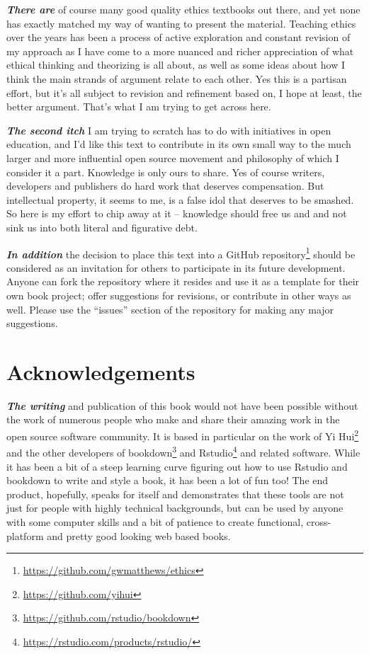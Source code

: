 \documentclass[12pt, openany]{book}
\renewcommand{\href}[2]{#2\footnote{\url{#1}}}
\begin{document}
\textbf{\emph{There are}} of course many good quality ethics textbooks out there, and yet none has exactly matched my way of wanting to present the material. Teaching ethics over the years has been a process of active exploration and constant revision of my approach as I have come to a more nuanced and richer appreciation of what ethical thinking and theorizing is all about, as well as some ideas about how I think the main strands of argument relate to each other. Yes this is a partisan effort, but it's all subject to revision and refinement based on, I hope at least, the better argument. That's what I am trying to get across here.

\textbf{\emph{The second itch}} I am trying to scratch has to do with initiatives in open education, and I'd like this text to contribute in its own small way to the much larger and more influential open source movement and philosophy of which I consider it a part. Knowledge is only ours to share. Yes of course writers, developers and publishers do hard work that deserves compensation. But intellectual property, it seems to me, is a false idol that deserves to be smashed. So here is my effort to chip away at it -- knowledge should free us and and not sink us into both literal and figurative debt.

\textbf{\emph{In addition}} the decision to place this text into a \href{https://github.com/gwmatthews/ethics}{GitHub repository} should be considered as an invitation for others to participate in its future development. Anyone can fork the repository where it resides and use it as a template for their own book project; offer suggestions for revisions, or contribute in other ways as well. Please use the ``issues'' section of the repository for making any major suggestions.

\hypertarget{acknowledgements}{%
\section*{Acknowledgements}\label{acknowledgements}}


\textbf{\emph{The writing}} and publication of this book would not have been possible without the work of numerous people who make and share their amazing work in the open source software community. It is based in particular on the work of \href{https://github.com/yihui}{Yi Hui} and the other developers of \href{https://github.com/rstudio/bookdown}{bookdown} and \href{https://rstudio.com/products/rstudio/}{Rstudio} and related software. While it has been a bit of a steep learning curve figuring out how to use Rstudio and bookdown to write and style a book, it has been a lot of fun too! The end product, hopefully, speaks for itself and demonstrates that these tools are not just for people with highly technical backgrounds, but can be used by anyone with some computer skills and a bit of patience to create functional, cross-platform and pretty good looking web based books.
\end{document}
